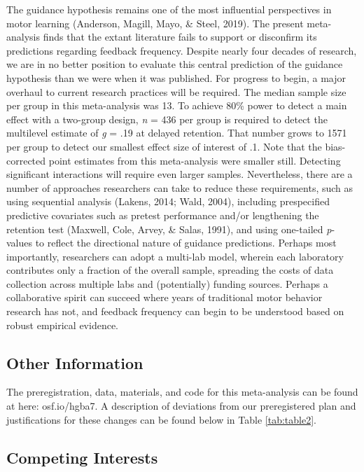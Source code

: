 \documentclass[
  english,
  man,mask,floatsintext]{apa7}
\begin{document}
The guidance hypothesis remains one of the most influential perspectives in motor learning (Anderson, Magill, Mayo, \& Steel, 2019). The present meta-analysis finds that the extant literature fails to support or disconfirm its predictions regarding feedback frequency. Despite nearly four decades of research, we are in no better position to evaluate this central prediction of the guidance hypothesis than we were when it was published. For progress to begin, a major overhaul to current research practices will be required. The median sample size per group in this meta-analysis was 13. To achieve 80\% power to detect a main effect with a two-group design, \emph{n} = 436 per group is required to detect the multilevel estimate of \emph{g} = .19 at delayed retention. That number grows to 1571 per group to detect our smallest effect size of interest of .1. Note that the bias-corrected point estimates from this meta-analysis were smaller still. Detecting significant interactions will require even larger samples. Nevertheless, there are a number of approaches researchers can take to reduce these requirements, such as using sequential analysis (Lakens, 2014; Wald, 2004), including prespecified predictive covariates such as pretest performance and/or lengthening the retention test (Maxwell, Cole, Arvey, \& Salas, 1991), and using one-tailed \emph{p}-values to reflect the directional nature of guidance predictions. Perhaps most importantly, researchers can adopt a multi-lab model, wherein each laboratory contributes only a fraction of the overall sample, spreading the costs of data collection across multiple labs and (potentially) funding sources. Perhaps a collaborative spirit can succeed where years of traditional motor behavior research has not, and feedback frequency can begin to be understood based on robust empirical evidence.

\hypertarget{other-information}{%
\subsection{Other Information}\label{other-information}}

The preregistration, data, materials, and code for this meta-analysis can be found at here: osf.io/hgba7. A description of deviations from our preregistered plan and justifications for these changes can be found below in Table \ref{tab:table2}.

\hypertarget{competing-interests}{%
\subsection{Competing Interests}\label{competing-interests}}
\end{document}
